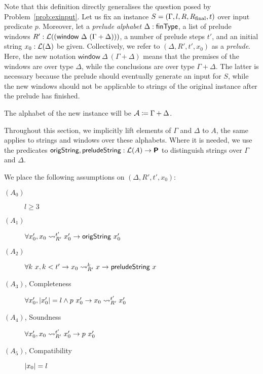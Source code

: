 Note that this definition directly generalises the question posed by Problem~\ref{prob:exinput}. 
Let us fix an \expr{} instance $S = (\Gamma, l, R, R_{\text{final}}, t)$ over input predicate $p$. 
Moreover, let a \emph{prelude alphabet} $\Delta : \textsf{finType}$, a list of prelude windows $R' : \mathcal{L} ((\textsf{window}~\Delta~(\Gamma + \Delta)))$, a number of prelude steps $t'$, and an initial string $x_0 : \mathcal{L} (\Delta)$ be given. Collectively, we refer to $(\Delta, R', t', x_0)$ as a \emph{prelude}. 
Here, the new notation $\textsf{window}~\Delta~(\Gamma + \Delta)$ means that the premises of the windows are over type $\Delta$, while the conclusions are over type $\Gamma + \Delta$. The latter is necessary because the prelude should eventually generate an input for $S$, while the new windows should not be applicable to strings of the original instance after the prelude has finished.

The alphabet of the new \PR{} instance will be $\mathcal{A} \coloneqq \Gamma + \Delta$.

\newcommand{\isOrigString}{\textsf{origString}}
\newcommand{\isPreludeString}{\textsf{preludeString}}
\mnote{\isOrigString}

Throughout this section, we implicitly lift elements of $\Gamma$ and $\Delta$ to $A$, the same applies to strings and windows over these alphabets. Where it is needed, we use the predicates $\isOrigString, \isPreludeString : \listsof{A} \rightarrow \Prop$ to distinguish strings over $\Gamma$ and $\Delta$. 
\mnote{\isPreludeString}

\begin{assumption}
  We place the following assumptions on $(\Delta, R', t', x_0)$: 
  \begin{description}
    \item[$(A_0)$] $l \ge 3$
    \item[$(A_1)$] $\forall x_0', x_0 \strent{R'}^{t'} x_0' \rightarrow \isOrigString~x_0'$
    \item[$(A_2)$] $\forall k~x, k < t' \rightarrow x_0 \strent{R'}^k x \rightarrow \isPreludeString~x$
    \item[$(A_3)$, Completeness] $\forall x_0', |x_0'| = l \land p~x_0' \rightarrow x_0 \rightsquigarrow_{R'}^{t'} x_0'$
    \item[$(A_4)$, Soundness] $\forall x_0', x_0 \rightsquigarrow_{R'}^{t'} x_0' \rightarrow p~x_0'$ 
    \item[$(A_5)$, Compatibility] $|x_0| = l$
  \end{description}
\end{assumption}

